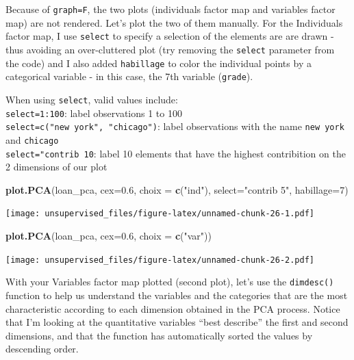 \documentclass[]{article}
\newenvironment{Shaded}{\begin{snugshade}}{\end{snugshade}}
\newcommand{\DataTypeTok}[1]{\textcolor[rgb]{0.13,0.29,0.53}{#1}}
\newcommand{\DecValTok}[1]{\textcolor[rgb]{0.00,0.00,0.81}{#1}}
\newcommand{\FloatTok}[1]{\textcolor[rgb]{0.00,0.00,0.81}{#1}}
\newcommand{\KeywordTok}[1]{\textcolor[rgb]{0.13,0.29,0.53}{\textbf{#1}}}
\newcommand{\NormalTok}[1]{#1}
\newcommand{\StringTok}[1]{\textcolor[rgb]{0.31,0.60,0.02}{#1}}
\begin{document}
Because of \texttt{graph=F}, the two plots (individuals factor map and
variables factor map) are not rendered. Let's plot the two of them
manually. For the Individuals factor map, I use \texttt{select} to
specify a selection of the elements are are drawn - thus avoiding an
over-cluttered plot (try removing the \texttt{select} parameter from the
code) and I also added \texttt{habillage} to color the individual points
by a categorical variable - in this case, the 7th variable
(\texttt{grade}).

When using \texttt{select}, valid values include:\\
\texttt{select=1:100}: label observations 1 to 100\\
\texttt{select=c("new\ york",\ "chicago")}: label observations with the
name \texttt{new\ york} and \texttt{chicago}\\
\texttt{select="contrib\ 10}: label 10 elements that have the highest
contribition on the 2 dimensions of our plot

\begin{Shaded}
\begin{Highlighting}[]
\KeywordTok{plot.PCA}\NormalTok{(loan_pca, }\DataTypeTok{cex=}\FloatTok{0.6}\NormalTok{, }\DataTypeTok{choix =} \KeywordTok{c}\NormalTok{(}\StringTok{"ind"}\NormalTok{), }\DataTypeTok{select=}\StringTok{"contrib 5"}\NormalTok{, }\DataTypeTok{habillage=}\DecValTok{7}\NormalTok{)}
\end{Highlighting}
\end{Shaded}

\texttt{[image: unsupervised\_files/figure-latex/unnamed-chunk-26-1.pdf]}

\begin{Shaded}
\begin{Highlighting}[]
\KeywordTok{plot.PCA}\NormalTok{(loan_pca, }\DataTypeTok{cex=}\FloatTok{0.6}\NormalTok{, }\DataTypeTok{choix =} \KeywordTok{c}\NormalTok{(}\StringTok{"var"}\NormalTok{))}
\end{Highlighting}
\end{Shaded}

\texttt{[image: unsupervised\_files/figure-latex/unnamed-chunk-26-2.pdf]}

With your Variables factor map plotted (second plot), let's use the
\texttt{dimdesc()} function to help us understand the variables and the
categories that are the most characteristic according to each dimension
obtained in the PCA process. Notice that I'm looking at the quantitative
variables ``best describe'' the first and second dimensions, and that
the function has automatically sorted the values by descending order.
\end{document}
